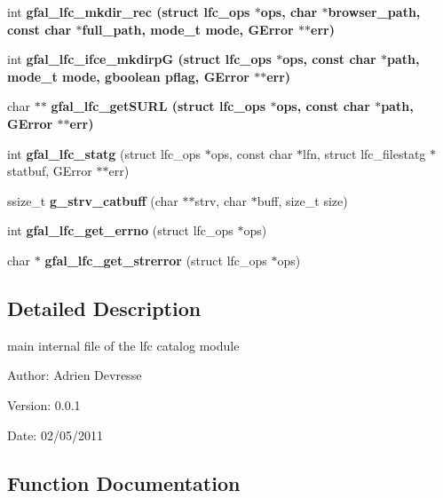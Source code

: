 \begin{CompactItemize}
\item 
int \bf{gfal\_\-lfc\_\-mkdir\_\-rec} (struct lfc\_\-ops $\ast$ops, char $\ast$browser\_\-path, const char $\ast$full\_\-path, mode\_\-t mode, GError $\ast$$\ast$err)
\item 
int \bf{gfal\_\-lfc\_\-ifce\_\-mkdirp\-G} (struct lfc\_\-ops $\ast$ops, const char $\ast$path, mode\_\-t mode, gboolean pflag, GError $\ast$$\ast$err)
\item 
char $\ast$$\ast$ \bf{gfal\_\-lfc\_\-get\-SURL} (struct lfc\_\-ops $\ast$ops, const char $\ast$path, GError $\ast$$\ast$err)
\item 
int \textbf{gfal\_\-lfc\_\-statg} (struct lfc\_\-ops $\ast$ops, const char $\ast$lfn, struct lfc\_\-filestatg $\ast$statbuf, GError $\ast$$\ast$err)\label{lfc__ifce__ng_8c_220714510c3f197e656ddea9f04ffec3}

\item 
ssize\_\-t \textbf{g\_\-strv\_\-catbuff} (char $\ast$$\ast$strv, char $\ast$buff, size\_\-t size)\label{lfc__ifce__ng_8c_bc04cd8d7342170700f02f6297fc4105}

\item 
int \textbf{gfal\_\-lfc\_\-get\_\-errno} (struct lfc\_\-ops $\ast$ops)\label{lfc__ifce__ng_8c_caa53981228e722b2175cfd7b4ca051c}

\item 
char $\ast$ \textbf{gfal\_\-lfc\_\-get\_\-strerror} (struct lfc\_\-ops $\ast$ops)\label{lfc__ifce__ng_8c_58172b62403dfd7a7b742548f074cd44}

\end{CompactItemize}


\subsection{Detailed Description}
main internal file of the lfc catalog module 

\begin{Desc}
\item[Author:]Adrien Devresse \end{Desc}
\begin{Desc}
\item[Version:]0.0.1 \end{Desc}
\begin{Desc}
\item[Date:]02/05/2011 \end{Desc}


\subsection{Function Documentation}
